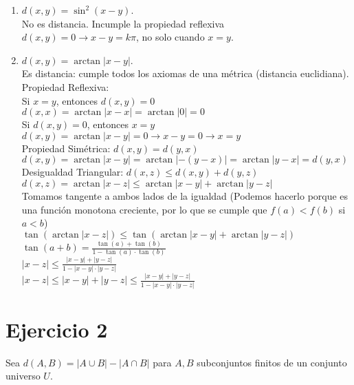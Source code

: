\documentclass[12pt]{article}
\begin{document}
\begin{enumerate}
\item $d(x,y) = \sin^2(x - y)$. \\
No es distancia. Incumple la propiedad reflexiva \\
$d(x,y)=0 \rightarrow x - y = k\pi$, no solo cuando $x=y$.

\item $d(x,y) = \arctan|x - y|$. \\
Es distancia: cumple todos los axiomas de una métrica (distancia euclidiana). \\

Propiedad Reflexiva: \\
Si $x=y$, entonces $d(x,y) = 0$ \\
$d(x,x) = \arctan|x-x| = \arctan|0| = 0$ \\
Si $d(x,y) = 0$, entonces $x=y$ \\
$d(x,y) = \arctan|x-y| = 0 \rightarrow x - y = 0 \rightarrow x = y$ \\

Propiedad Simétrica: $d(x,y) = d(y,x)$ \\
$d(x,y) = \arctan| x - y | = \arctan| - (y - x) | = \arctan|y - x| = d(y,x)$ \\

Desigualdad Triangular: $d(x,z) \leq d(x,y) + d(y,z)$ \\
$d(x,z) = \arctan| x - z| \leq \arctan| x - y| + \arctan| y - z|$ \\
Tomamos tangente a ambos lados de la igualdad (Podemos hacerlo porque es una función monotona creciente, por lo que se cumple que $f(a) < f(b)$ si $a < b$) \\
$\tan(\arctan| x - z|) \leq \tan(\arctan| x - y| + \arctan| y - z|)$ \\

$\tan(a + b) = \frac{\tan(a)+\tan(b)}{1-\tan(a)\cdot\tan(b)}$ \\ 

$|x-z| \leq \frac{| x - y| + | y - z|}{1 - | x - y| \cdot | y - z|}$ \\
$|x-z| \leq | x - y| + | y - z| \leq \frac{| x - y| + | y - z|}{1 - | x - y| \cdot | y - z|}$

\end{enumerate}

\section*{Ejercicio 2}

Sea $d(A,B) = |A \cup B| - |A \cap B|$ para $A,B$ subconjuntos finitos de un conjunto universo $U$.
\end{document}
